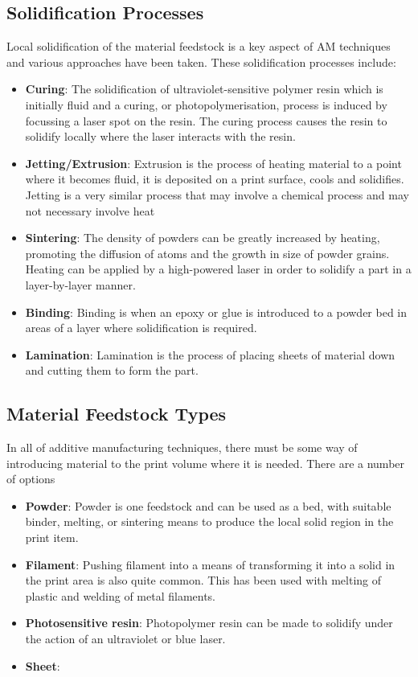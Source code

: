 \subsection{Solidification Processes}

Local solidification of the material feedstock is a key aspect of AM techniques and various approaches have been taken. These solidification processes include: 
\begin{itemize}
 \item \textbf{Curing}: The solidification of ultraviolet-sensitive polymer resin which is initially fluid and a curing, or photopolymerisation, process is induced by focussing a laser spot on the resin. The curing process causes the resin to solidify locally where the laser interacts with the resin. 
 \item \textbf{Jetting/Extrusion}: Extrusion is the process of heating material to a point where it becomes fluid, it is deposited on a print surface, cools and solidifies. Jetting is a very similar process that may involve a chemical process and may not necessary involve heat 
 \item \textbf{Sintering}: The density of powders can be greatly increased by heating, promoting the diffusion of atoms and the growth in size of powder grains. Heating can be applied by a high-powered laser in order to solidify a part in a layer-by-layer manner. 
 \item \textbf{Binding}: Binding is when an epoxy or glue is introduced to a powder bed in areas of a layer where solidification is required. 
 \item \textbf{Lamination}: Lamination is the process of placing sheets of material down and cutting them to form the part. 
\end{itemize}

  
\subsection{Material Feedstock Types }

In all of additive manufacturing techniques, there must be some way of introducing material to the print volume where it is needed. There are a number of options 
\begin{itemize}
 \item \textbf{Powder}: Powder is one feedstock and can be used as a bed, with suitable binder, melting, or sintering means to produce the local solid region in the print item. 
  \item \textbf{Filament}: Pushing filament into a means of transforming it into a solid in the print area is also quite common. This has been used with melting of plastic and welding of metal filaments. 
  \item \textbf{Photosensitive resin}: Photopolymer resin can be made to solidify under the action of an ultraviolet or blue laser. 
  \item \textbf{Sheet}: 
\end{itemize}

